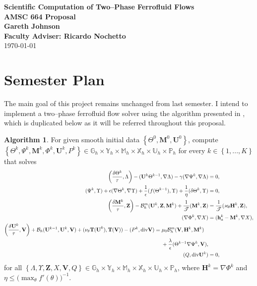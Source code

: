 \documentclass[11pt,fullpage]{article}
\newcommand{\eps}{\epsilon}
\newcommand{\set}[1]{\left\{#1\right\}}
\newcommand{\grad}{\nabla}
\newcommand{\diver}{\textup{div} }
\theoremstyle{lemma}
\theoremstyle{definition}
\newtheorem{algorithm}{Algorithm}
\theoremstyle{lemma}
\begin{document}
	
\begin{center}
	\textbf{\Large{Scientific Computation of Two--Phase Ferrofluid Flows}}
	\\
	\textbf{\Large{AMSC 664 Proposal}} \\ 
	\textbf{\large{Gareth Johnson}}\\
	\textbf{\large{Faculty Adviser: Ricardo Nochetto}}
	\\
	\today
\end{center}

\section{Semester Plan}

The main goal of this project remains unchanged from last semester. I intend to implement a two--phase ferrofluid flow solver using the algorithm presented in \cite{DiffuseInterface}, which is duplicated below as it will be referred throughout this proposal. 
\begin{algorithm}
	For given smooth initial data $\set{\Theta^0, \mathbf{M}^0,\mathbf{U}^0}$, compute $\set{\Theta^k, \Psi^k, \mathbf{M}^k, \Phi^k, \mathbf{U}^k, {P}^k}\in \mathbb{G}_h\times \mathbb{Y}_h\times \mathbb{M}_h\times\mathbb{X}_h\times\mathbb{U}_h\times\mathbb{P}_h$ for every $k\in\set{1,...,K}$ that solves
	\begin{subequations}\label{NumScheme}
		\begin{align}
		\label{NumScheme:1}\bigg(\frac{\delta\Theta^k}{\tau}, \Lambda\bigg) - (\mathbf{U}^k\Theta^{k-1}, \grad\Lambda) - \gamma(\grad \Psi^k, \grad \Lambda)&=0,\\
		\label{NumScheme:2}(\Psi^k, \Upsilon) + \eps(\grad \Theta^k, \grad \Upsilon) + \frac{1}{\eps}(f(\Theta^{k-1}), \Upsilon) + \frac{1}{\eta}(\delta\Theta^k, \Upsilon) &= 0,\\
		\label{NumScheme:3}\bigg(\frac{\delta\mathbf{M}^k}{\tau}, \mathbf{Z}\bigg) - \mathcal{B}_h^m(\mathbf{U}^k, \mathbf{Z}, \mathbf{M}^k) + \frac{1}{\mathscr{T}}(\mathbf{M}^k, \mathbf{Z}) &= \frac{1}{\mathscr{T}}(\varkappa_\theta\mathbf{H}^k, \mathbf{Z}),\\
		\label{NumScheme:4}(\grad\Phi^k, \grad X) &= (\mathbf{h}_a^k - \mathbf{M}^k, \grad X),\\
		\begin{split}
		\label{NumScheme:5}\bigg(\frac{\delta\mathbf{U}^k}{\tau}, \mathbf{V}\bigg) + \mathcal{B}_h(\mathbf{U}^{k-1}, \mathbf{U}^k, \mathbf{V}) + (\nu_\theta\mathbf{T(U}^k), \mathbf{T(V)}) - (P^k, \diver \mathbf{V}) &= \mu_0\mathcal{B}_h^m(\mathbf{V}, \mathbf{H}^k, \mathbf{M}^k)\\
		&\phantom{{}={}}+\frac{\lambda}{\eps}(\Theta^{k-1}\grad \Psi^k, \mathbf{V}),
		\end{split}\\
		\label{NumScheme:6}(Q, \diver\mathbf{U}^k) &= 0,
		\end{align}
	\end{subequations}
	for all $\set{\Lambda, \Upsilon, \mathbf{Z}, X, \mathbf{V}, Q}\in \mathbb{G}_h\times \mathbb{Y}_h\times \mathbb{M}_h\times\mathbb{X}_h\times\mathbb{U}_h\times\mathbb{P}_h$, where $\mathbf{H}^k=\grad \Phi^k$ and $\eta \leq \big(\max_\theta f'(\theta)\big)^{-1}$.
\end{algorithm}
\end{document}
